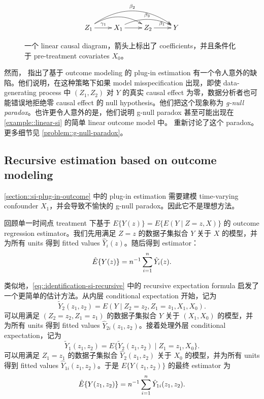 \begin{figure}[t]
\bigskip 
$$
 \xymatrix{
 Z_1 \ar[r]^{\gamma_1}   \ar@/^1.3pc/[rr]  \ar@/^2.0pc/[rrr]^{\beta_2} & X_1  \ar@/^1pc/[rr]^{\beta_3}  \ar[r] & Z_2  \ar[r]^{\beta_1} & Y
 }
 $$
 \caption{一个 linear causal diagram，箭头上标出了 coefficients，并且条件化于 pre-treatment covariates $X_0$。}\label{fig::si-simple-coefficients}
\end{figure}
 
 
 


然而，\citet{robinswasserman1997estimation} 指出了基于 outcome modeling 的 plug-in estimation 有一个令人意外的缺陷。他们说明，在这种策略下如果 model misspecification 出现，即使 data-generating process 中 $(Z_1,Z_2)$ 对 $Y$ 的真实 causal effect 为零，数据分析者也可能错误地拒绝零 causal effect 的 null hypothesis。他们把这个现象称为 {\it g-null paradox}。也许更令人意外的是，他们说明 g-null paradox 甚至可能出现在 \cref{example::linear-si} 的简单 linear outcome model 中。\citet{mcgrath2021revisiting} 重新讨论了这个 paradox。更多细节见 \cref{problem::g-null-paradox}。

 

\subsection{Recursive estimation based on outcome modeling}
\label{section::recursive}

\cref{section::si-plug-in-outcome} 中的 plug-in estimation 需要建模 time-varying confounder $X_1$，并会导致不愉快的 g-null paradox。因此它不是理想方法。

回顾单一时间点 treatment 下基于 $E\{  Y(z)  \} = E\{  E(Y\mid Z=z, X) \}$ 的 outcome regression estimator。我们先用满足 $Z=z$ 的数据子集拟合 $Y$ 关于 $X$ 的模型，并为所有 units 得到 fitted values $\hat{Y}_i(z)$。随后得到 estimator：
$$
\hat E\{  Y(z)  \}  = n^{-1} \sum_{i=1}^n \hat{Y}_i(z).
$$

类似地，\cref{eq::identification-si-recursive} 中的 recursive expectation formula 启发了一个更简单的估计方法。从内层 conditional expectation 开始，记为
$$
\tilde Y_2(z_1, z_2) = E(Y\mid Z_2 = z_2,Z_1 = z_1, X_1,  X_0).
$$ 
可以用满足 $(Z_2 = z_2, Z_1 = z_1)$ 的数据子集拟合 $Y$ 关于 $(X_1,X_0)$ 的模型，并为所有 units 得到 fitted values $\hat{Y}_{2i}(z_1, z_2) $。接着处理外层 conditional expectation，记为
$$
\tilde{Y}_1(z_1, z_2)  =  E\{  \tilde{Y}_2(z_1, z_2)  \mid Z_1=z_1, X_0 \}. 
$$
可以用满足 $Z_1=z_1$ 的数据子集拟合 $\hat{Y}_2(z_1, z_2) $ 关于 $X_0$ 的模型，并为所有 units 得到 fitted values $\hat{Y}_{1i}(z_1, z_2) $。于是 $E\{ Y(z_1, z_2) \} $ 的最终 estimator 为
$$
\hat E\{ Y(z_1, z_2) \}  = n^{-1} \sum_{i=1}^n \hat{Y}_{1i}(z_1, z_2) .
$$

